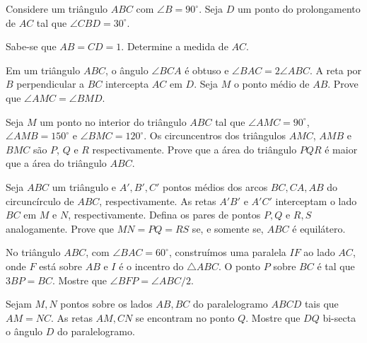 \begin{questao}
  Considere um triângulo $ABC$ com $\angle B = 90^\circ$. Seja
  $D$ um ponto do prolongamento de $AC$ tal que $\angle CBD =
  30^\circ$.

  Sabe-se que $AB=CD=1$. Determine a medida de $AC$.
\end{questao}

\begin{questao}
  Em um triângulo $ABC$, o ângulo $\angle BCA$ é obtuso e
  $\angle BAC = 2 \angle ABC$. A reta por $B$ perpendicular a $BC$
  intercepta $AC$ em $D$. Seja $M$ o ponto médio de $AB$. Prove
  que $\angle AMC = \angle BMD$.

\end{questao}

\begin{questao}
  Seja $M$ um ponto no interior do triângulo $ABC$ tal que
  $\angle AMC = 90^\circ$, $\angle AMB = 150^\circ$ e $\angle BMC =
  120^\circ$. Os circuncentros dos triângulos $AMC$, $AMB$ e
  $BMC$ são $P$, $Q$ e $R$ respectivamente. Prove que a área do
  triângulo $PQR$ é maior que a área do triângulo $ABC$.

\end{questao}

\begin{questao}
  Seja $ABC$ um triângulo e $A',B',C'$
  pontos médios dos arcos $BC,CA,AB$ do circuncírculo de $ABC$,
  respectivamente. As retas $A' B'$ e $A'
  C'$ interceptam o lado $BC$ em $M$ e $N$,
  respectivamente. Defina os pares de pontos $P,Q$ e $R,S$
  analogamente. Prove que $MN=PQ=RS$ se, e somente se, $ABC$ é
  equilátero.

\end{questao}

\begin{questao}
  No triângulo $ABC$, com $\angle BAC = 60^\circ$,
  construímos uma paralela $IF$ ao lado $AC$, onde $F$ está sobre
  $AB$ e $I$ é o incentro do $\bigtriangleup ABC$. O ponto $P$
  sobre $BC$ é tal que $3BP=BC$. Mostre que $\angle BFP = \angle
  ABC/2$.

\end{questao}

\begin{questao}
  Sejam $M,N$ pontos sobre os lados $AB,BC$ do paralelogramo
  $ABCD$ tais que $AM=NC$. As retas $AM,CN$ se encontram no
  ponto $Q$. Mostre que $DQ$ bi-secta o ângulo $D$ do
  paralelogramo.
\end{questao}

